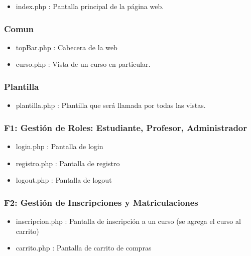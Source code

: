 \documentclass[
]{article}
\providecommand{\tightlist}{%
  \setlength{\itemsep}{0pt}\setlength{\parskip}{0pt}}
\begin{document}
\begin{itemize}
\tightlist
\item
  index.php : Pantalla principal de la página web.
\end{itemize}

\subsubsection{Comun}\label{comun}

\begin{itemize}
\item
  topBar.php : Cabecera de la web
\item
  curso.php : Vista de un curso en particular.
\end{itemize}

\subsubsection{Plantilla}\label{plantilla}

\begin{itemize}
\tightlist
\item
  plantilla.php : Plantilla que será llamada por todas las vistas.
\end{itemize}

\subsubsection{F1: Gestión de Roles: Estudiante, Profesor,
Administrador}\label{f1-gestiuxf3n-de-roles-estudiante-profesor-administrador}

\begin{itemize}
\item
  login.php : Pantalla de login
\item
  registro.php : Pantalla de registro
\item
  logout.php : Pantalla de logout
\end{itemize}

\subsubsection{F2: Gestión de Inscripciones y
Matriculaciones}\label{f2-gestiuxf3n-de-inscripciones-y-matriculaciones}

\begin{itemize}
\item
  inscripcion.php : Pantalla de inscripción a un curso (se agrega el
  curso al carrito)
\item
  carrito.php : Pantalla de carrito de compras
\end{itemize}
\end{document}

